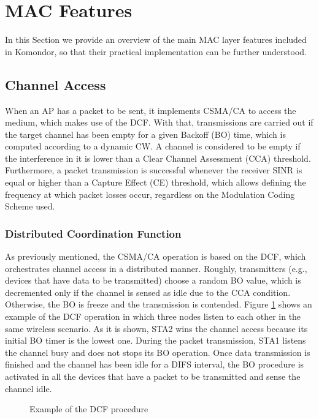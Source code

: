 \documentclass[a4paper]{article}
\begin{document}
\section{MAC Features}
\label{section:mac_features}
In this Section we provide an overview of the main MAC layer features included in Komondor, so that their practical implementation can be further understood.
	
	\subsection{Channel Access}
	\label{section:channel_access}
	When an AP has a packet to be sent, it implements CSMA/CA to access the medium, which makes use of the DCF. With that, transmissions are carried out if the target channel has been empty for a given Backoff (BO) time, which is computed according to a dynamic CW. A channel is considered to be empty if the interference in it is lower than a Clear Channel Assessment (CCA) threshold. Furthermore, a packet transmission is successful whenever the receiver SINR is equal or higher than a Capture Effect (CE) threshold, which allows defining the frequency at which packet losses occur, regardless on the Modulation Coding Scheme used.
		
		\subsubsection{Distributed Coordination Function}
		\label{section:dcf}		
		As previously mentioned, the CSMA/CA operation is based on the DCF, which orchestrates channel access in a distributed manner. Roughly, transmitters (e.g., devices that have data to be transmitted) choose a random BO value, which is decremented only if the channel is sensed as idle due to the CCA condition. Otherwise, the BO is freeze and the transmission is contended. Figure \ref{fig:dcf_operation} shows an example of the DCF operation in which three nodes listen to each other in the same wireless scenario. As it is shown, STA2 wins the channel access because its initial BO timer is the lowest one. During the packet transmission, STA1 listens the channel busy and does not stops its BO operation. Once data transmission is finished and the channel has been idle for a DIFS interval, the BO procedure is activated in all the devices that have a packet to be transmitted and sense the channel idle.
		\begin{figure}[h!]
			\centering
			\caption{Example of the DCF procedure}
			\label{fig:dcf_operation}
		\end{figure}
			
\end{document}
